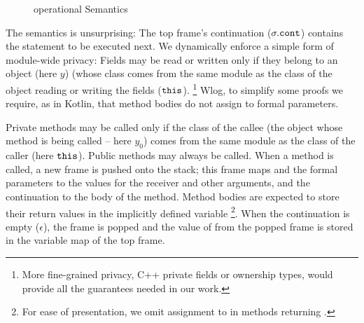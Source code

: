 \begin{figure}[bt]
\begin{minipage}{\textwidth}
{
 }
\end{minipage}
 \caption{\LangOO operational Semantics}
\label{f:loo-semantics}
\end{figure}

The semantics is unsurprising:  
The  top frame's continuation {(${\sigma.\mbox{\normalfont{\texttt{cont}}}}$)} contains the statement to be  executed next.  
We dynamically enforce a simple form of module-wide privacy: 
Fields may be read or written only if they {belong to an object (here $y$)}  (whose class comes from the same module as the  class of the object 
reading or writing the fields ($\mbox{\normalfont{\texttt{this}}}$). \footnote{More fine-grained privacy, \eg C++ private fields or ownership types, would provide all
the guarantees needed in our work.}%
Wlog, {to simplify some proofs} we  require, as in Kotlin, that method bodies do not assign to formal parameters.

Private methods may be called only if the class of %
the callee ({the object whose method  is being called -- here $y_0$}) %
comes from the same module as the  class of the caller (here $\mbox{\normalfont{\texttt{this}}}$).
Public methods may always be called.
When a method is called, a new frame is pushed onto the stack; this frame  maps  and the formal parameters to  the values for the receiver and other arguments, and the continuation to the body of the method. 
Method bodies are expected to store their return values in the {implicitly defined} variable \footnote{For ease of presentation, we omit assignment to  in methods returning .}. %
  When the continuation is  empty ($\epsilon$), the frame is popped and the value of 
 from the popped frame  is stored  in the variable map of the top frame.

